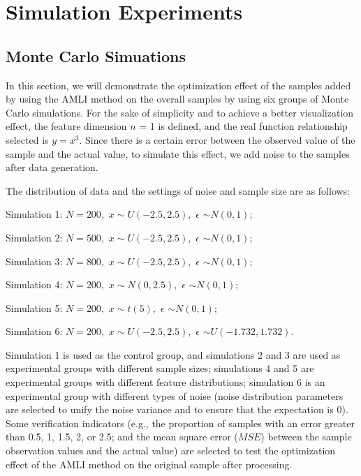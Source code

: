 \documentclass[mathematics,article,accept,pdftex,moreauthors]{Definitions/mdpi}
\begin{document}
\section{Simulation Experiments}

\subsection{Monte Carlo Simuations}

 In this section, we will demonstrate the optimization effect of the samples added by using the AMLI method on the overall samples by using six groups of Monte Carlo simulations. For the sake of simplicity and to achieve a better visualization effect, the feature dimension $n$ = 1 is defined, and the real function relationship selected is $y=x^{3}$. Since there is a certain error between the observed value of the sample and the actual value, to simulate this effect, we add noise to the samples after data generation.

The distribution of data and the settings of noise and sample size are as follows:

Simulation 1: $N=200,$ $x \sim U(-2.5, 2.5), $ $\epsilon$ $\sim N(0, 1); $

Simulation 2: $N=500,$ $x \sim U(-2.5, 2.5), $ $\epsilon$ $\sim N(0, 1); $

Simulation 3: $N=800,$ $x \sim U(-2.5, 2.5), $ $\epsilon$ $\sim N(0, 1); $

Simulation 4: $N=200,$ $x \sim N(0, 2.5), $ $\epsilon$ $\sim N(0, 1); $

Simulation 5: $N=200,$ $x \sim t(5),$ $\epsilon$ $\sim N(0, 1); $

Simulation 6: $N=200,$ $x \sim U(-2.5, 2.5),$ $\epsilon$ $\sim U(-1.732, 1.732). $

Simulation 1 is used as the control group, and simulations 2 and 3 are used as experimental groups with different sample sizes; simulations 4 and 5 are experimental groups with different feature distributions; simulation 6 is an experimental group with different types of noise (noise distribution parameters are selected to unify the noise variance and to ensure that the expectation is 0). Some verification indicators (e.g., the proportion of samples with an error greater than 0.5, 1, 1.5, 2, or 2.5; and the mean square error ($MSE$) between the sample observation values and the actual value) are selected to test the optimization effect of the AMLI method on the original sample after processing.
\end{document}
